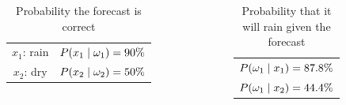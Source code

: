 \begin{frame}
{\begin{example}
\begin{columns}
      \begin{column}{0.33\textwidth}
        \begin{table}[H]
          \centering
          \begin{tabular}{c|c}
            $x_1$: rain & $P(x_1 \mid \omega_1) = 90\%$ \\
            $x_2$: dry & $P(x_2 \mid \omega_2) = 50\%$
          \end{tabular}
          \caption{Probability the forecast is correct}
        \end{table}
      \end{column}
      \begin{column}{0.33\textwidth}
        \begin{table}[H]
          \centering
          \begin{tabular}{c}
            $P(\omega_1 \mid x_1) = 87.8\%$ \\
            $P(\omega_1 \mid x_2) = 44.4\%$
          \end{tabular}
          \caption{Probability that it will rain given the forecast}
        \end{table}
      \end{column}
    \end{columns}
  \end{example}
  }
\end{frame}


